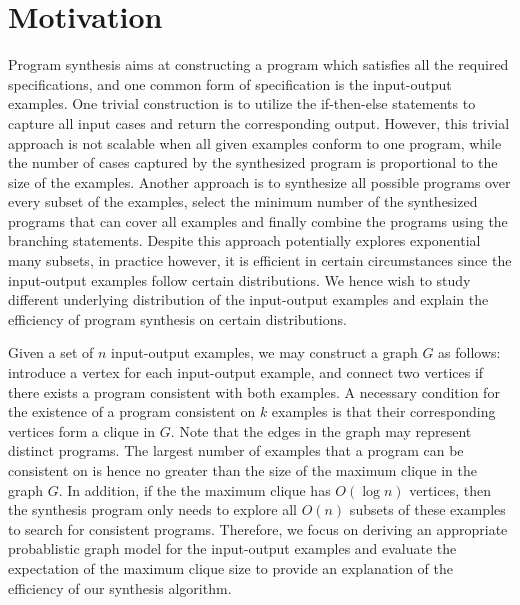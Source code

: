 \documentclass{article}
\begin{document}
\newpage
\maketitle



\section{Motivation}

Program synthesis aims at constructing a program which satisfies all the required specifications, and one common form of specification is the input-output examples. One trivial construction is to utilize the if-then-else statements to capture all input cases and return the corresponding output. However, this trivial approach is not scalable when all given examples conform to one program, while the number of cases captured by the synthesized program is proportional to the size of the examples. Another approach is to synthesize all possible programs over every subset of the examples, select the minimum number of the synthesized programs that can cover all examples and finally combine the programs using the branching statements. Despite this approach potentially explores exponential many subsets, in practice however, it is efficient in certain circumstances since the input-output examples follow certain distributions. We hence wish to study different underlying distribution of the input-output examples and explain the efficiency of program synthesis on certain distributions. 


Given a set of $n$ input-output examples, we may construct a graph $G$ as follows: introduce a vertex for each input-output example, and connect two vertices if there exists a program consistent with both examples. A necessary condition for the existence of a program consistent on $k$ examples is that their corresponding vertices form a clique in $G$. Note that the edges in the graph may represent distinct programs. The largest number of examples that a program can be consistent on is hence no greater than the size of the maximum clique in the graph $G$. In addition, if the the maximum clique has $O(\log n)$ vertices, then the synthesis program only needs to explore all $O(n)$ subsets of these examples to search for consistent programs. Therefore, we focus on deriving an appropriate probablistic graph model for the input-output examples and evaluate the expectation of the maximum clique size to provide an explanation of the efficiency of our synthesis algorithm.  
\end{document}

